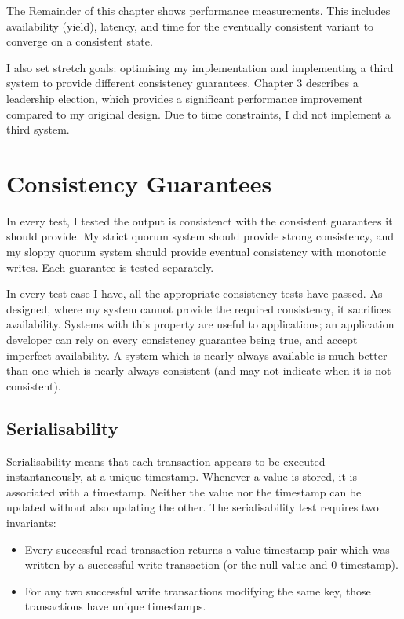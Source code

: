 \documentclass[12pt,a4paper,twoside,openany]{report}
\begin{document}
The Remainder of this chapter shows performance measurements. This includes availability (yield), latency, and time for the eventually consistent variant to converge on a consistent state.

I also set stretch goals: optimising my implementation and implementing a third system to provide different consistency guarantees. Chapter 3 describes a leadership election, which provides a significant performance improvement compared to my original design. Due to time constraints, I did not implement a third system.

\section{Consistency Guarantees}

In every test, I tested the output is consistenct with the consistent guarantees it should provide. My strict quorum system should provide strong consistency, and my sloppy quorum system should provide eventual consistency with monotonic writes. Each guarantee is tested separately.

In every test case I have, all the appropriate consistency tests have passed. As designed, where my system cannot provide the required consistency, it sacrifices availability. Systems with this property are useful to applications; an application developer can rely on every consistency guarantee being true, and accept imperfect availability. A system which is nearly always available is much better than one which is nearly always consistent (and may not indicate when it is not consistent).

\subsection{Serialisability}

Serialisability means that each transaction appears to be executed instantaneously, at a unique timestamp. Whenever a value is stored, it is associated with a timestamp. Neither the value nor the timestamp can be updated without also updating the other. The serialisability test requires two invariants:

\begin{itemize}
  \item
  Every successful read transaction returns a value-timestamp pair which was written by a successful write transaction (or the null value and 0 timestamp).

  \item
  For any two successful write transactions modifying the same key, those transactions have unique timestamps.

\end{itemize}
\end{document}
